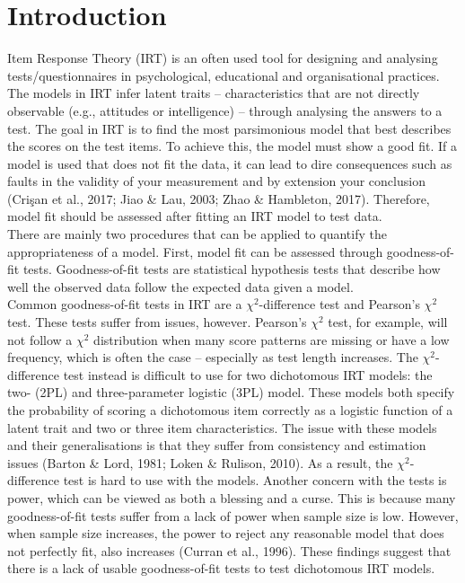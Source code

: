 \documentclass[Royal,sageapa,times,doublespace]{sagej}
\begin{document}
\section{Introduction}
Item Response Theory (IRT) is an often used tool for designing and analysing tests/questionnaires in psychological, educational and organisational practices. The models in IRT infer latent traits -- characteristics that are not directly observable (e.g., attitudes or intelligence) -- through analysing the answers to a test. The goal in IRT is to find the most parsimonious model that best describes the scores on the test items. To achieve this, the model must show a good fit. If a model is used that does not fit the data, it can lead to dire consequences such as faults in the validity of your measurement and by extension your conclusion (Cri\c{s}an et al., 2017; Jiao \& Lau, 2003; Zhao \& Hambleton, 2017). Therefore, model fit should be assessed after fitting an IRT model to test data. \\
\indent There are mainly two procedures that can be applied to quantify the appropriateness of a model. First, model fit can be assessed through goodness-of-fit tests. Goodness-of-fit tests are statistical hypothesis tests that describe how well the observed data follow the expected data given a model. \\
\indent Common goodness-of-fit tests in IRT are a $\chi^2$-difference test and Pearson's $\chi^2$ test. These tests suffer from issues, however. Pearson's $\chi^2$ test, for example, will not follow a $\chi^2$ distribution when many score patterns are missing or have a low frequency, which is often the case -- especially as test length increases. The $\chi^2$-difference test instead is difficult to use for two dichotomous IRT models: the two- (2PL) and three-parameter logistic (3PL) model. These models both specify the probability of scoring a dichotomous item correctly as a logistic function of a latent trait and two or three item characteristics. The issue with these models and their generalisations is that they suffer from consistency and estimation issues (Barton \& Lord, 1981; Loken \& Rulison, 2010). As a result, the $\chi^2$-difference test is hard to use with the models. Another concern with the tests is power, which can be viewed as both a blessing and a curse. This is because many goodness-of-fit tests suffer from a lack of power when sample size is low. However, when sample size increases, the power to reject any reasonable model that does not perfectly fit, also increases (Curran et al., 1996). These findings suggest that there is a lack of usable goodness-of-fit tests to test dichotomous IRT models. \\
\end{document}

